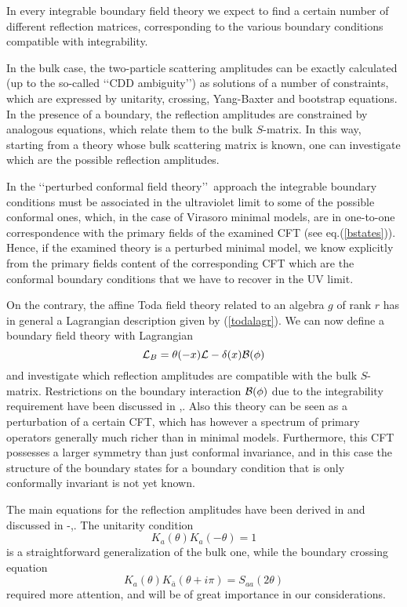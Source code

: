 \documentclass[a4paper,12pt]{report}
\begin{document}
In every integrable boundary field theory we expect to find a certain number of different reflection matrices,
corresponding to the various boundary conditions compatible with integrability.

In the bulk case, the two-particle scattering amplitudes can be exactly calculated (up to the so-called \lq\lq CDD
ambiguity\rq\rq) as solutions of a number of constraints, which are expressed by unitarity, crossing, Yang-Baxter
and bootstrap equations. In the presence of a boundary, the reflection amplitudes are constrained by analogous
equations, which relate them to the bulk $S$-matrix. In this way, starting from a theory whose bulk scattering
matrix is known, one can investigate which are the possible reflection amplitudes.

\vspace{0.5cm}

In the \lq\lq perturbed conformal field theory\rq\rq \, approach the integrable boundary conditions must be
associated in the ultraviolet limit to some of the possible conformal ones, which, in the case of Virasoro
minimal models, are in one-to-one correspondence with the primary fields of the examined CFT (see
eq.(\ref{bstates})). Hence, if the examined theory is a perturbed minimal model, we know explicitly from the
primary fields content of the corresponding CFT which are the conformal boundary conditions that we have to
recover in the UV limit.

On the contrary, the affine Toda field theory related to an algebra $g$ of rank $r$ has in general a Lagrangian
description given by (\ref{todalagr}). We can now define a boundary field theory with Lagrangian
\begin{equation}\label{todabound}
{\cal L}_{B}=\theta(-x){\cal L}-\delta(x){\cal B}(\phi)
\end{equation}
and investigate which reflection amplitudes are compatible with the bulk $S$-matrix. Restrictions on the boundary
interaction ${\cal B}(\phi)$ due to the integrability requirement have been discussed in \cite{durb},\cite{durb2}.
Also this theory can be seen as a perturbation of a certain CFT, which has however a spectrum of primary operators
generally much richer than in minimal models. Furthermore, this CFT possesses a larger symmetry than just
conformal invariance, and in this case the structure of the boundary states for a boundary condition that is only
conformally invariant is not yet known.

\newpage

The main equations for the reflection amplitudes have been derived in \cite{ghoszam} and discussed in
\cite{fring0}-\cite{sas},\cite{corr}. The unitarity condition
\begin{equation}\label{unit}
K_{a}\left(\theta\right)K_{a}\left(-\theta\right)=1
\end{equation}
is a straightforward generalization of the bulk one, while the boundary crossing equation
\begin{equation}\label{cross}
K_{a}\left(\theta\right)K_{\bar{a}}\left(\theta+i\pi\right)=S_{aa}\left(2\theta\right)
\end{equation}
required more attention, and will be of great importance in our considerations.
\end{document}
